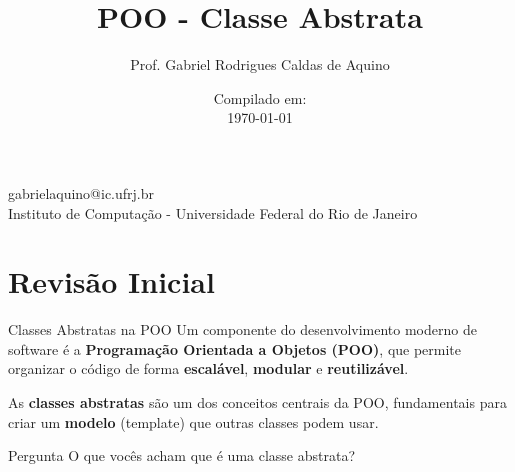 \title{POO - Classe Abstrata}

\author{Prof. Gabriel Rodrigues Caldas de Aquino}

\institute
{
    gabrielaquino@ic.ufrj.br\\

    Instituto de Computação -
    Universidade Federal do Rio de Janeiro %
}
\date{Compilado em: \\ \today} %


\section{Revisão Inicial}

\begin{frame}
    \titlepage
\end{frame}




\begin{frame}{Classes Abstratas na POO}
    Um componente do desenvolvimento moderno de software é a
    \textbf{Programação Orientada a Objetos (POO)},
    que permite organizar o código de forma
    \textbf{escalável}, \textbf{modular} e \textbf{reutilizável}.

    \vspace{0.3cm}
    As \textbf{classes abstratas} são um dos conceitos centrais da POO,
    fundamentais para criar um \textbf{modelo} (template) que outras classes podem usar.

    \begin{block}{Pergunta}
        O que vocês acham que é uma classe abstrata?
    \end{block}
\end{frame}


